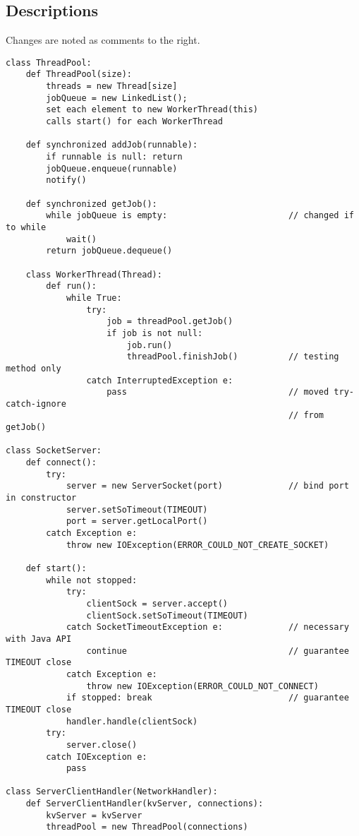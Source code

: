 \subsection{Descriptions}
Changes are noted as comments to the right.
\begin{verbatim}
class ThreadPool:
    def ThreadPool(size):
        threads = new Thread[size]
        jobQueue = new LinkedList();
        set each element to new WorkerThread(this)
        calls start() for each WorkerThread

    def synchronized addJob(runnable):
        if runnable is null: return
        jobQueue.enqueue(runnable)
        notify()

    def synchronized getJob():
        while jobQueue is empty:                        // changed if to while
            wait()
        return jobQueue.dequeue()

    class WorkerThread(Thread):
        def run():
            while True:
                try:
                    job = threadPool.getJob()
                    if job is not null:
                        job.run()
                        threadPool.finishJob()          // testing method only
                catch InterruptedException e:
                    pass                                // moved try-catch-ignore
                                                        // from getJob()

class SocketServer:
    def connect():
        try:
            server = new ServerSocket(port)             // bind port in constructor
            server.setSoTimeout(TIMEOUT)
            port = server.getLocalPort()
        catch Exception e:
            throw new IOException(ERROR_COULD_NOT_CREATE_SOCKET)

    def start():
        while not stopped:
            try:
                clientSock = server.accept()
                clientSock.setSoTimeout(TIMEOUT)
            catch SocketTimeoutException e:             // necessary with Java API
                continue                                // guarantee TIMEOUT close
            catch Exception e:
                throw new IOException(ERROR_COULD_NOT_CONNECT)
            if stopped: break                           // guarantee TIMEOUT close
            handler.handle(clientSock)
        try:
            server.close()
        catch IOException e:
            pass

class ServerClientHandler(NetworkHandler):
    def ServerClientHandler(kvServer, connections):
        kvServer = kvServer
        threadPool = new ThreadPool(connections)


\end{verbatim}
